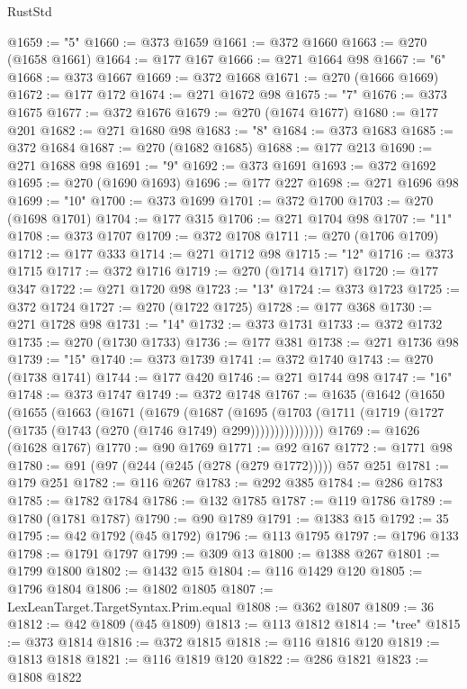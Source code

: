 \begin{lexlean}{RustStd}
\begin{coremodule}
@1659 := "5"
@1660 := @373 @1659
@1661 := @372 @1660
@1663 := @270 (@1658 @1661)
@1664 := @177 @167
@1666 := @271 @1664 @98
@1667 := "6"
@1668 := @373 @1667
@1669 := @372 @1668
@1671 := @270 (@1666 @1669)
@1672 := @177 @172
@1674 := @271 @1672 @98
@1675 := "7"
@1676 := @373 @1675
@1677 := @372 @1676
@1679 := @270 (@1674 @1677)
@1680 := @177 @201
@1682 := @271 @1680 @98
@1683 := "8"
@1684 := @373 @1683
@1685 := @372 @1684
@1687 := @270 (@1682 @1685)
@1688 := @177 @213
@1690 := @271 @1688 @98
@1691 := "9"
@1692 := @373 @1691
@1693 := @372 @1692
@1695 := @270 (@1690 @1693)
@1696 := @177 @227
@1698 := @271 @1696 @98
@1699 := "10"
@1700 := @373 @1699
@1701 := @372 @1700
@1703 := @270 (@1698 @1701)
@1704 := @177 @315
@1706 := @271 @1704 @98
@1707 := "11"
@1708 := @373 @1707
@1709 := @372 @1708
@1711 := @270 (@1706 @1709)
@1712 := @177 @333
@1714 := @271 @1712 @98
@1715 := "12"
@1716 := @373 @1715
@1717 := @372 @1716
@1719 := @270 (@1714 @1717)
@1720 := @177 @347
@1722 := @271 @1720 @98
@1723 := "13"
@1724 := @373 @1723
@1725 := @372 @1724
@1727 := @270 (@1722 @1725)
@1728 := @177 @368
@1730 := @271 @1728 @98
@1731 := "14"
@1732 := @373 @1731
@1733 := @372 @1732
@1735 := @270 (@1730 @1733)
@1736 := @177 @381
@1738 := @271 @1736 @98
@1739 := "15"
@1740 := @373 @1739
@1741 := @372 @1740
@1743 := @270 (@1738 @1741)
@1744 := @177 @420
@1746 := @271 @1744 @98
@1747 := "16"
@1748 := @373 @1747
@1749 := @372 @1748
@1767 := @1635
    (@1642
      (@1650
        (@1655
          (@1663
            (@1671
              (@1679
                (@1687
                  (@1695
                    (@1703
                      (@1711 (@1719 (@1727 (@1735 (@1743 (@270 (@1746 @1749) @299)))))))))))))))
@1769 := @1626 (@1628 @1767)
@1770 := @90 @1769
@1771 := @92 @167
@1772 := @1771 @98
@1780 := @91 (@97 (@244 (@245 (@278 (@279 @1772))))) @57 @251
@1781 := @179 @251
@1782 := @116 @267
@1783 := @292 @385
@1784 := @286 @1783
@1785 := @1782 @1784
@1786 := @132 @1785
@1787 := @119 @1786
@1789 := @1780 (@1781 @1787)
@1790 := @90 @1789
@1791 := @1383 @15
@1792 := 35
@1795 := @42 @1792 (@45 @1792)
@1796 := @113 @1795
@1797 := @1796 @133
@1798 := @1791 @1797
@1799 := @309 @13
@1800 := @1388 @267
@1801 := @1799 @1800
@1802 := @1432 @15
@1804 := @116 @1429 @120
@1805 := @1796 @1804
@1806 := @1802 @1805
@1807 := LexLeanTarget.TargetSyntax.Prim.equal
@1808 := @362 @1807
@1809 := 36
@1812 := @42 @1809 (@45 @1809)
@1813 := @113 @1812
@1814 := "tree"
@1815 := @373 @1814
@1816 := @372 @1815
@1818 := @116 @1816 @120
@1819 := @1813 @1818
@1821 := @116 @1819 @120
@1822 := @286 @1821
@1823 := @1808 @1822

\end{coremodule}
\end{lexlean}

